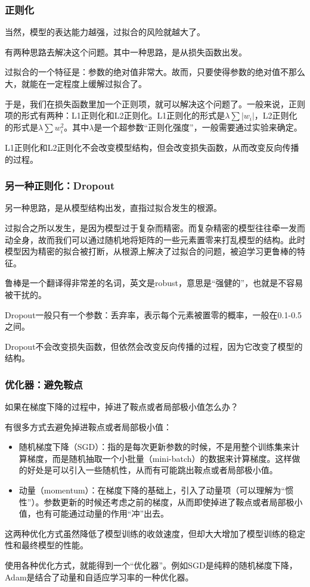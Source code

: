 \documentclass{ctexbeamer}
\begin{document}
\begin{frame}
    \frametitle{正则化}

    当然，模型的表达能力越强，过拟合的风险就越大了。

    有两种思路去解决这个问题。其中一种思路，是从损失函数出发。

    过拟合的一个特征是：参数的绝对值非常大。故而，只要使得参数的绝对值不那么大，就能在一定程度上缓解过拟合了。

    于是，我们在损失函数里加一个正则项，就可以解决这个问题了。一般来说，正则项的形式有两种：L1正则化和L2正则化。L1正则化的形式是$\lambda \sum |w_i|$，L2正则化的形式是$\lambda \sum w_i^2$。其中$\lambda$是一个超参数“正则化强度”，一般需要通过实验来确定。

    L1正则化和L2正则化不会改变模型结构，但会改变损失函数，从而改变反向传播的过程。

\end{frame}

\begin{frame}
    \frametitle{另一种正则化：Dropout}

    另一种思路，是从模型结构出发，直指过拟合发生的根源。

    过拟合之所以发生，是因为模型过于复杂而精密。而复杂精密的模型往往牵一发而动全身，故而我们可以通过随机地将矩阵的一些元素置零来打乱模型的结构。此时模型因为精密的拟合被打断，从根源上解决了过拟合的问题，被迫学习更鲁棒的特征。

    鲁棒是一个翻译得非常差的名词，英文是robust，意思是“强健的”，也就是不容易被干扰的。

    Dropout一般只有一个参数：丢弃率，表示每个元素被置零的概率，一般在0.1-0.5之间。

    Dropout不会改变损失函数，但依然会改变反向传播的过程，因为它改变了模型的结构。

\end{frame}

\begin{frame}
    \frametitle{优化器：避免鞍点}

    如果在梯度下降的过程中，掉进了鞍点或者局部极小值怎么办？

    有很多方式去避免掉进鞍点或者局部极小值：
    \begin{itemize}
        \item 随机梯度下降（SGD）：指的是每次更新参数的时候，不是用整个训练集来计算梯度，而是随机抽取一个小批量（mini-batch）的数据来计算梯度。这样做的好处是可以引入一些随机性，从而有可能跳出鞍点或者局部极小值。
        \item 动量（momentum）：在梯度下降的基础上，引入了动量项（可以理解为“惯性”）。参数更新的时候还考虑之前的梯度，从而即使掉进了鞍点或者局部极小值，也有可能通过动量的作用“冲”出去。
    \end{itemize}

    这两种优化方式虽然降低了模型训练的收敛速度，但却大大增加了模型训练的稳定性和最终模型的性能。

    使用各种优化方式，就能得到一个“优化器”。例如SGD是纯粹的随机梯度下降，Adam是结合了动量和自适应学习率的一种优化器。

\end{frame}
\end{document}
